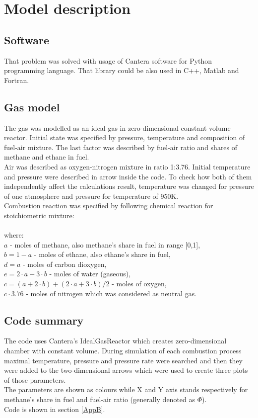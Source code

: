 		
		\section{Model description}
		
		\subsection{Software}
		That problem was solved with usage of Cantera software for Python programming language. That library could be also used in C++, Matlab and Fortran.
		
		\subsection{Gas model}
		The gas was modelled as an ideal gas in zero-dimensional constant volume reactor. Initial state was specified by pressure, temperature and composition of fuel-air mixture. The last factor was described by fuel-air ratio and shares of methane and ethane in fuel.
		\\ Air was described as oxygen-nitrogen mixture in ratio 1:3.76. Initial temperature and pressure were described in arrow inside the code. To check how both of them independently affect the calculations result, temperature was changed for pressure of one atmosphere and pressure for temperature of 950K. 
		\\ Combustion reaction was specified by following chemical reaction for stoichiometric mixture:
		\\ 
		\\ where:
		\\ $a$ - moles of methane, also methane's share in fuel in range [0,1],
		\\ $b=1-a$ - moles of ethane, also ethane's share in fuel,
		\\ $d=a$ - moles of carbon dioxygen,
		\\ $e=2 \cdot a+3 \cdot b$ - moles of water (gaseous),
		\\ $c=(a+2 \cdot b)+(2 \cdot a+3 \cdot b)/2$ - moles of oxygen,
		\\ $c \cdot 3.76$ - moles of nitrogen which was considered as neutral gas.
		
		\subsection{Code summary}
		The code uses Cantera's IdealGasReactor which creates zero-dimensional chamber with constant volume. During simulation of each combustion process maximal temperature, pressure and pressure rate were searched and then they were added to the two-dimensional arrows which were used to create three plots of those parameters.
		\\ The parameters are shown as colours while X and Y axis stands respectively for methane's share in fuel and fuel-air ratio (generally denoted as $\Phi$).
		\\ Code is shown in section \ref{AppB}.
		
